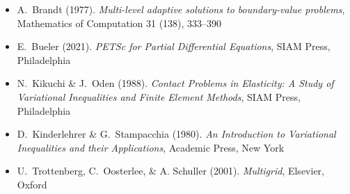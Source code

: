 
\newcommand{\sdoi}[1]{\,{\tiny \href{https://doi.org/#1}{doi:#1}}}
\begin{itemize}
\item A.~Brandt (1977). \emph{Multi-level adaptive solutions to boundary-value problems}, Mathematics of Computation 31 (138), 333--390
\item E.~Bueler (2021). \emph{PETSc for Partial Differential Equations}, SIAM Press, Philadelphia
\item N.~Kikuchi \& J.~Oden (1988).  \emph{Contact Problems in Elasticity: A Study of Variational Inequalities and Finite Element Methods}, SIAM Press, Philadelphia
\item D.~Kinderlehrer \& G.~Stampacchia (1980). \emph{An Introduction to Variational Inequalities and their Applications}, Academic Press, New York
\item U.~Trottenberg, C.~Oosterlee, \& A. Schuller (2001).  \emph{Multigrid}, Elsevier, Oxford
\end{itemize}

